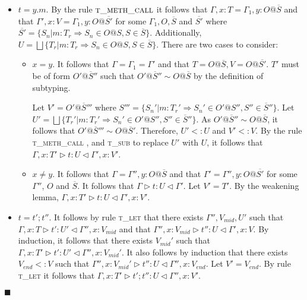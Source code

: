 \documentclass{article}
\newcommand{\tlet}{\textsc{t\_let} }
\newcommand{\tfunc}{\textsc{t\_fun\_call} }
\newcommand{\tmethc}{\textsc{t\_meth\_call} }
\newcommand{\tsub}{\textsc{t\_sub} }
\newcommand{\typerule}[4]{#1 \triangleright #2 : #3 \triangleleft #4}
\newcommand{\qed}{$\blacksquare$}
\newenvironment{proof}{\vspace{1ex}\noindent{\bf Proof}\hspace{0.5em}}
  {\hfill\qed\vspace{1ex}}
\begin{document}
\begin{proof}
\begin{itemize}
\begin{itemize}
\item $x \in \overline{z_i}$, meaning that $T = T_i$ and 
$V = T_i' = remap(T, U_i >> V_i)$ for some $i$. 
Let $V' = remap(T', U_i >> V_i)$.
The rule \tfunc permits $T$ to be replaced with $T'$
as $T' <: T$, such that
$\typerule{\Gamma, x : T'}{y ( \overline{z_i} )}{U}{\Gamma, x : V'}$.

\end{itemize}

\item $t = y.m$. By the rule $\tmethc$ it follows that
$\Gamma, x : T = \Gamma_1, y : O@\overline{S}$
and that
$\Gamma', x : V = \Gamma_1, y : O@\overline{S'}$
for some $\Gamma_1, O, \overline{S}$ and $\overline{S'}$
where
$\overline{S'} = \{ S_n | m : T_r \Rightarrow S_n \in O@S, S \in \overline{S} \}$.
Additionally, 
$U = \bigsqcup{ \{ T_r | m : T_r \Rightarrow S_n \in O@S, S \in \overline{S} \} }$.
There are two cases to consider:

\begin{itemize}
\item $x = y$. It follows that $\Gamma = \Gamma_1 = \Gamma'$ and
that $T = O@\overline{S}, V = O@\overline{S'}$.
$T'$ must be of form $O'@\overline{S}''$ such that
$O'@\overline{S}'' \sim O@\overline{S}$ by the definition of subtyping. 

Let $V' = O'@\overline{S}'''$
where
$S''' = \{ S_n' | m : T_r' \Rightarrow S_n' \in O'@S'', S'' \in \overline{S}''\}$.
Let $U' = \bigsqcup{ \{ T_r' | m : T_r' \Rightarrow S_n' \in O'@S'', S'' \in \overline{S}'' \} }$.
As $O'@\overline{S}'' \sim O@\overline{S}$, it follows that
$O'@\overline{S}''' \sim O@\overline{S}'$.
Therefore, $U' <: U$ and $V' <: V$. By the rule \tmethc, and \tsub
to replace $U'$ with $U$, it follows that
$\typerule{\Gamma, x : T'}{t}{U}{\Gamma', x : V'}$.

\item $x \neq y$. It follows that $\Gamma = \Gamma'', y : O@\overline{S}$
and that $\Gamma' = \Gamma'', y : O@\overline{S'}$
for some $\Gamma''$, $O$ and $\overline{S}$.
It follows that $\typerule{\Gamma}{t}{U}{\Gamma'}$.
Let $V' = T'$. By the weakening lemma, 
$\typerule{\Gamma, x : T'}{t}{U}{\Gamma', x : V'}$.
\end{itemize}

\item $t = t' ; t''$. It follows by rule \tlet that there exists
$\Gamma'', V_{mid}, U'$ 
such that $\typerule{\Gamma, x : T}{t'}{U'}{\Gamma'', x : V_{mid}}$
and that $\typerule{\Gamma'', x : V_{mid}}{t''}{U}{\Gamma', x : V}$.
By induction, it follows that there exists $V_{mid}'$ 
such that $\typerule{\Gamma, x : T'}{t'}{U'}{\Gamma'', x : V_{mid}'}$.
It also follows by induction that there exists $V_{end} <: V$
such that
$\typerule{\Gamma'', x : V_{mid}'}{t''}{U}{\Gamma'', x : V_{end}}$.
Let $V' = V_{end}$. By rule \tlet it follows that
$\typerule{\Gamma, x : T'}{t' ; t''}{U}{\Gamma'', x : V'}$.


\end{itemize}
\end{proof}
\end{document}
